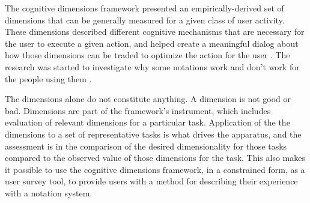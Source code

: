 The cognitive dimensions framework presented an empirically-derived set of dimensions that can be generally measured for a given class of user activity. These dimensions described different cognitive mechanisms that are necessary for the user to execute a given action, and helped create a meaningful dialog about how those dimensions can be traded to optimize the action for the user \citep{blackwell-2003}. The research was started to investigate why some notations work and don't work for the people using them \citep{petre-2006}. 

The dimensions alone do not constitute anything. A dimension is not good or bad. Dimensions are part of the framework's instrument, which includes evaluation of relevant dimensions for a particular task. Application of the the dimensions to a set of representative tasks is what drives the apparatus, and the assessment is in the comparison of the desired dimensionality for those tasks compared to the observed value of those dimensions for the task. This also makes it possible to use the cognitive dimensions framework, in a constrained form, as a user survey tool, to provide users with a method for describing their experience with a notation system.

